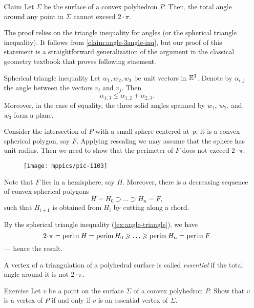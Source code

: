 \begin{thm}{Claim}\label{clm:total-angle}
Let $\Sigma$ be the surface of a convex polyhedron $P$.
Then, the total angle around any point in $\Sigma$ cannot exceed $2\cdot\pi$.
\end{thm}

The proof relies on the triangle inequality for angles (or the spherical triangle inequality).
It follows from \ref{claim:angle-3angle-inq}, but our proof of this statement is a straightforward generalization of the argument in the classical geometry textbook \cite[§ 47]{kiselev-stereo-en} that proves following staement.

\begin{thm}{Spherical triangle inequality}\label{ex:angle-triangle}
Let $w_1,w_2,w_3$ be unit vectors in $\mathbb{E}^3$.
Denote by $\alpha_{i,j}$ the angle between the vectors $v_i$ and $v_j$.
Then
$$\alpha_{1,3}\le \alpha_{1,2}+\alpha_{2,3}.$$
Moreover, in the case of equality, the three solid angles spanned by $w_1$, $w_2$, and $w_3$ form a plane.
\end{thm}

Consider the intersection of $P$ with a small sphere centered at~$p$;
it is a convex spherical polygon, say $F$.
Applying rescaling we may assume that the sphere has unit radius.
Then we need to show that the perimeter of $F$ does not exceed $2\cdot\pi$.

\begin{wrapfigure}{o}{22mm}
\vskip-4mm
\centering
\texttt{[image: mppics/pic-1103]}
\end{wrapfigure}

Note that $F$ lies in a hemisphere, say $H$.
Moreover, there is a decreasing sequence of convex spherical polygons
\[H=H_0\supset\dots\supset H_n=F,\]
such that $H_{i+1}$ is obtained from $H_{i}$ by cutting along a chord.

By the spherical triangle inequality (\ref{ex:angle-triangle}), we have
\[
2\cdot\pi=\perim H=\perim H_0\ge\dots\ge\perim H_n=\perim F
\]
--- hence the result.
\qedsf

A vertex of a triangulation of a polyhedral surface is called \emph{essential} if the total angle around it is not $2\cdot\pi$.

\begin{thm}{Exercise}\label{ex:vertex-essential-vertex}
Let $v$ be a point on the surface $\Sigma$ of a convex polyhedron $P$.
Show that $v$ is a vertex of $P$ if and only if
$v$ is an essential vertex of $\Sigma$.
\end{thm}



